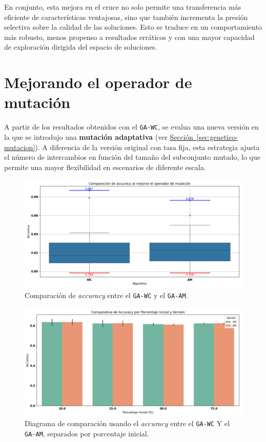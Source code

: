 En conjunto, esta mejora en el cruce no solo permite una transferencia más eficiente de características ventajosas,
sino que también incrementa la presión selectiva sobre la calidad de las soluciones.
Esto se traduce en un comportamiento más robusto, menos propenso a resultados erráticos y con una mayor capacidad de exploración dirigida del espacio de soluciones.


\section{Mejorando el operador de mutación}\label{sec:mejorando-mutacion}
A partir de los resultados obtenidos con el \texttt{GA-WC}, se evalua una nueva versión en la que se introdujo una \textbf{mutación adaptativa}
(ver \hyperref[sec:genetico-mutacion]{Sección~\ref*{sec:genetico-mutacion}}).
A diferencia de la versión original con tasa fija, esta estrategia ajusta el número de intercambios en función del tamaño del subconjunto mutado,
lo que permite una mayor flexibilidad en escenarios de diferente escala.

\begin{figure}[htp]
    \centering
    \includegraphics[width=1\textwidth]{imagenes/evaluaciones/mutacion-adaptativa}
    \caption{Comparación de \textit{accuracy} entre el \texttt{GA-WC} y el \texttt{GA-AM}.}
    \label{fig:mutacion-adaptativa}
\end{figure}

\begin{figure}[htp]
    \centering
    \includegraphics[width=1\textwidth]{imagenes/evaluaciones/mutacion-adaptativa_por_porcentaje}
    \caption{Diagrama de comparación usando el \textit{accuracy} entre el \texttt{GA-WC} Y el \texttt{GA-AM}, separados por porcentaje inicial.}
    \label{fig:mutacion-adaptativa-porcentaje}
\end{figure}

